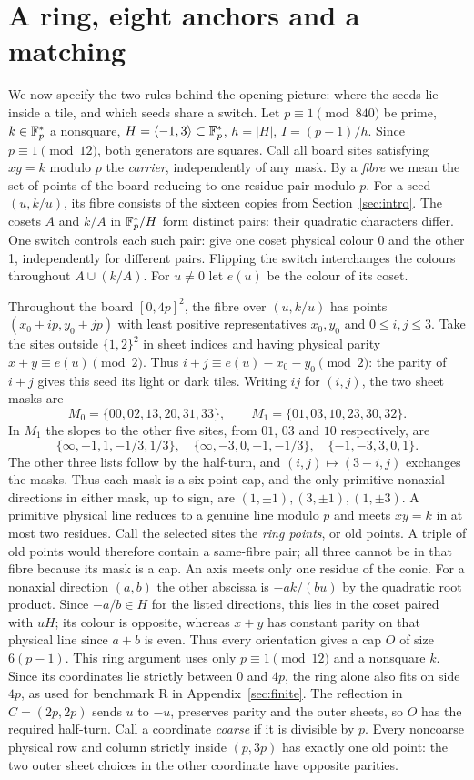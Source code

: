 \section{A ring, eight anchors and a matching}\label{sec:ring}
We now specify the two rules behind the opening picture: where the seeds lie inside a tile, and which seeds share a switch. Let $p\equiv1\pmod{840}$ be prime, $k\in\mathbb F_p^*$ a nonsquare, $H=\langle -1,3\rangle\subset\mathbb F_p^*$, $h=|H|$, $I=(p-1)/h$. Since $p\equiv1\pmod{12}$, both generators are squares. Call all board sites satisfying $xy=k$ modulo $p$ the \emph{carrier}, independently of any mask. By a \emph{fibre} we mean the set of points of the board reducing to one residue pair modulo $p$. For a seed $(u,k/u)$, its fibre consists of the sixteen copies from Section~\ref{sec:intro}. The cosets $A$ and $k/A$ in $\mathbb F_p^*/H$ form distinct pairs: their quadratic characters differ. One switch controls each such pair: give one coset physical colour 0 and the other 1, independently for different pairs. Flipping the switch interchanges the colours throughout $A\cup(k/A)$. For $u\ne0$ let $e(u)$ be the colour of its coset.

Throughout the board $[0,4p]^2$, the fibre over $(u,k/u)$ has points $(x_0+ip,y_0+jp)$ with least positive representatives $x_0,y_0$ and $0\le i,j\le3$. Take the sites outside $\{1,2\}^2$ in sheet indices and having physical parity $x+y\equiv e(u)\pmod 2$. Thus $i+j\equiv e(u)-x_0-y_0\pmod 2$: the parity of $i+j$ gives this seed its light or dark tiles. Writing $ij$ for $(i,j)$, the two sheet masks are
\[
 M_0=\{00,02,13,20,31,33\},\qquad M_1=\{01,03,10,23,30,32\}.
\]
In $M_1$ the slopes to the other five sites, from $01$, $03$ and $10$ respectively, are
\[
 \{\infty,-1,1,-1/3,1/3\},\quad
 \{\infty,-3,0,-1,-1/3\},\quad
 \{-1,-3,3,0,1\}.
\]
The other three lists follow by the half-turn, and $(i,j)\mapsto(3-i,j)$ exchanges the masks. Thus each mask is a six-point cap, and the only primitive nonaxial directions in either mask, up to sign, are $(1,\pm1),(3,\pm1),(1,\pm3)$. A primitive physical line reduces to a genuine line modulo $p$ and meets $xy=k$ in at most two residues. Call the selected sites the \emph{ring points}, or old points. A triple of old points would therefore contain a same-fibre pair; all three cannot be in that fibre because its mask is a cap. An axis meets only one residue of the conic. For a nonaxial direction $(a,b)$ the other abscissa is $-ak/(bu)$ by the quadratic root product. Since $-a/b\in H$ for the listed directions, this lies in the coset paired with $uH$; its colour is opposite, whereas $x+y$ has constant parity on that physical line since $a+b$ is even. Thus every orientation gives a cap $O$ of size $6(p-1)$. This ring argument uses only $p\equiv1\pmod{12}$ and a nonsquare $k$. Since its coordinates lie strictly between $0$ and $4p$, the ring alone also fits on side $4p$, as used for benchmark R in Appendix~\ref{sec:finite}. The reflection in $C=(2p,2p)$ sends $u$ to $-u$, preserves parity and the outer sheets, so $O$ has the required half-turn. Call a coordinate \emph{coarse} if it is divisible by $p$. Every noncoarse physical row and column strictly inside $(p,3p)$ has exactly one old point: the two outer sheet choices in the other coordinate have opposite parities.

